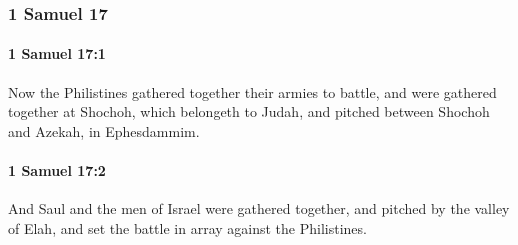 	\subsubsection{1 Samuel 17} %
		\label{1SAMUEL-17}

		\paragraph{1 Samuel 17:1} %
			\label{1SAMUEL-17-1}

			Now the Philistines gathered together their armies to battle, and were gathered together at Shochoh, which belongeth to Judah, and pitched between Shochoh and Azekah, in Ephesdammim.


		\paragraph{1 Samuel 17:2} %
			\label{1SAMUEL-17-2}

			And Saul and the men of Israel were gathered together, and pitched by the valley of Elah, and set the battle in array against the Philistines.

